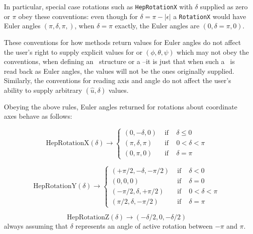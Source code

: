 In particular, special case rotations such as
{\tt HepRotationX} with $\delta$ supplied as zero or $\pi$
obey these conventions:  even though for $\delta = \pi - |\epsilon|$
a {\tt RotationX} would have Euler angles $( \pi, \delta, \pi, )$,
when $\delta = \pi$ exactly, the Euler angles are $(0, \delta=\pi, 0)$.

These conventions for how methods return values for Euler angles
do not affect the user's right to supply explicit values for
or $ ( \phi, \theta, \psi ) $ which may not obey the conventions,
when defining an \Es\ structure or a \Rotation--it is just that when
such a \Rotation\ is read back as Euler angles, the values will not be
the ones originally supplied.
Similarly, the conventions for reading axis and angle do not affect the
user's ability to supply arbitrary $ ( \hat{u}, \delta) $ values.

Obeying the above rules, Euler angles returned for
rotations about coordinate axes behave as follows:

\begin{equation}
\mbox{HepRotationX}(\delta) \longrightarrow
\left\{
\begin{array}{ccc}
( 0, -\delta, 0 ) & \mbox{ if } & \delta \leq 0 \\
( \pi, \delta, \pi ) & \mbox{ if } & 0 < \delta < \pi \\
( 0, \pi, 0 ) & \mbox{ if } & \delta = \pi
\end{array}
\right.
	\label{eq:rotXconv}
\end{equation}

\begin{equation}
\mbox{HepRotationY}(\delta) \longrightarrow
\left\{
\begin{array}{ccc}
( +\pi/2, -\delta, -\pi/2 ) & \mbox{ if } & \delta <  0 \\
( 0, 0, 0) & \mbox{ if } & \delta = 0 \\
( -\pi/2, \delta, +\pi/2 ) & \mbox{ if } & 0 <  \delta < \pi \\
( \pi/2, \delta, -\pi/2 ) & \mbox{ if } & \delta = \pi
\end{array}
\right.
	\label{eq:rotYconv}
\end{equation}

\begin{equation}
\mbox{HepRotationZ}(\delta) \longrightarrow ( -\delta/2, 0, -\delta/2 )
	\label{eq:rotZconv}
\end{equation}
\noindent always assuming that $\delta$ represents an angle of active rotation
between $-\pi$ and $\pi$.

